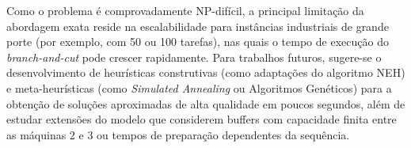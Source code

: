 Como o problema é comprovadamente NP-difícil, a principal limitação da abordagem exata reside na escalabilidade para instâncias industriais de grande porte (por exemplo, com 50 ou 100 tarefas), nas quais o tempo de execução do \textit{branch-and-cut} pode crescer rapidamente. Para trabalhos futuros, sugere-se o desenvolvimento de heurísticas construtivas (como adaptações do algoritmo NEH) e meta-heurísticas (como \textit{Simulated Annealing} ou Algoritmos Genéticos) para a obtenção de soluções aproximadas de alta qualidade em poucos segundos, além de estudar extensões do modelo que considerem buffers com capacidade finita entre as máquinas 2 e 3 ou tempos de preparação dependentes da sequência.
